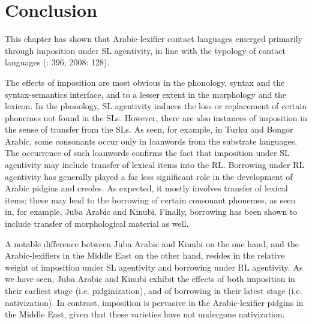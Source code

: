 \documentclass[output=paper]{langsci/langscibook}
\begin{document}
\section{Conclusion}\label{sec:conc}

This chapter has shown that Arabic-lexifier contact languages emerged primarily through imposition under SL agentivity, in line with the typology of contact languages (\citealt{Winford2005}: 396; 2008: 128). 

The effects of imposition are most obvious in the phonology, syntax and the syntax-semantics interface, and to a lesser extent in the morphology and the lexicon. In the phonology, SL agentivity induces the loss or replacement of certain phonemes not found in the SLs. However, there are also instances of imposition in the sense of transfer from the SLs. As seen, for example, in Turku and Bongor Arabic, some consonants occur only in loanwords from the substrate languages. The occurrence of such loanwords confirms the fact that imposition under SL agentivity may include transfer of lexical items into the RL. Borrowing under RL agentivity has generally played a far less significant role in the development of Arabic pidgins and creoles. As expected, it mostly involves transfer of lexical items; these may lead to the borrowing of certain consonant phonemes, as seen in, for example, Juba Arabic and Kinubi. Finally, borrowing has been shown to include transfer of morphological material as well.

A notable difference between Juba Arabic and Kinubi on the one hand, and the Arabic-lexifiers in the Middle East on the other hand, resides in the relative weight of imposition under SL agentivity and borrowing under RL agentivity. As we have seen, Juba Arabic and Kinubi exhibit the effects of both imposition in their earliest stage (i.e. pidginization), and of borrowing in their latest stage (i.e. nativization). In contrast, imposition is pervasive in the Arabic-lexifier pidgins in the Middle East, given that these varieties have not undergone nativization.
\end{document}
